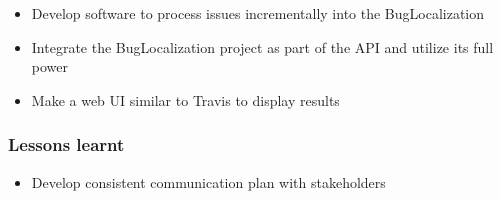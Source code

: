 \documentclass[12pt]{article}
\providecommand{\tightlist}{%
  \setlength{\itemsep}{0pt}\setlength{\parskip}{0pt}}
\begin{document}
\begin{itemize}
\tightlist
\item
  Develop software to process issues incrementally into the
  BugLocalization
\item
  Integrate the BugLocalization project as part of the API and utilize
  its full power
\item
  Make a web UI similar to Travis to display results
\end{itemize}

\hypertarget{lessons-learnt}{%
\subsubsection{Lessons learnt}\label{lessons-learnt}}

\begin{itemize}
\tightlist
\item
  Develop consistent communication plan with stakeholders
\end{itemize}



\end{document}
